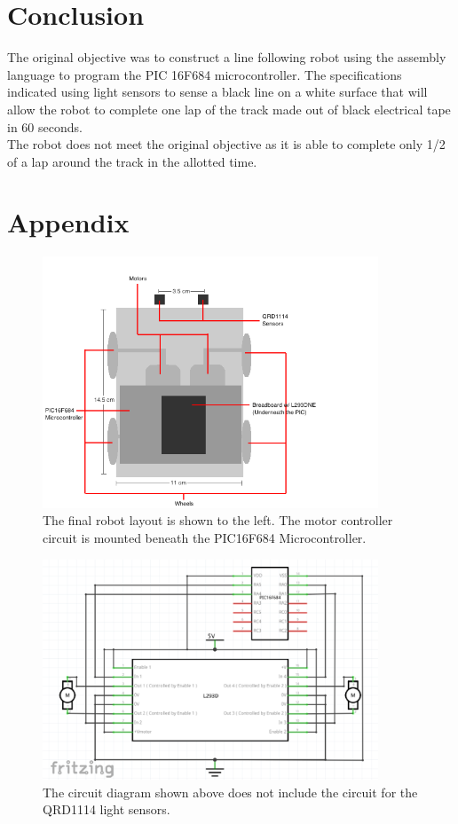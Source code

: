 \documentclass[12pt]{article}
\begin{document}
\section{Conclusion}
The original objective was to construct a line following robot using the assembly language to program the PIC 16F684 microcontroller. The specifications indicated using light sensors to sense a black line on a white surface that will allow the robot to complete one lap of the track made out of black electrical tape in 60 seconds.
\\[\baselineskip]
The robot does not meet the original objective as it is able to complete only 1/2 of a lap around the track in the allotted time.
\newpage
\section{Appendix}
	\begin{figure}
		\includegraphics[width=10cm]{LayoutDiagram}
		\caption{The final robot layout is shown to the left. The motor controller circuit is mounted beneath the PIC16F684 Microcontroller.}
	\end{figure}
	\begin{figure}
	\includegraphics[width=10cm]{CircuitDiagram}
	\caption{The circuit diagram shown above does not include the circuit for the QRD1114 light sensors.}
	\end{figure}
\end{document}
